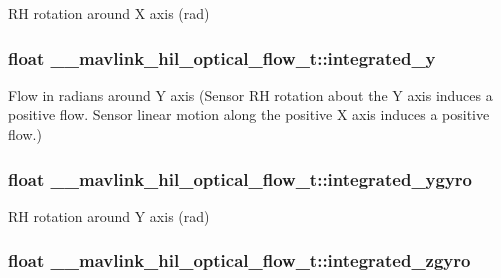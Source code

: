 R\+H rotation around X axis (rad) 

\hypertarget{struct____mavlink__hil__optical__flow__t_a86deaa7c99afacaa74d663e569bb9c47}{
\subsubsection[{integrated\+\_\+y}]{\setlength{\rightskip}{0pt plus 5cm}float \+\_\+\+\_\+mavlink\+\_\+hil\+\_\+optical\+\_\+flow\+\_\+t\+::integrated\+\_\+y}}\label{struct____mavlink__hil__optical__flow__t_a86deaa7c99afacaa74d663e569bb9c47}


Flow in radians around Y axis (Sensor R\+H rotation about the Y axis induces a positive flow. Sensor linear motion along the positive X axis induces a positive flow.) 

\hypertarget{struct____mavlink__hil__optical__flow__t_a31864b9e729286b1e081349f73a8be4e}{
\subsubsection[{integrated\+\_\+ygyro}]{\setlength{\rightskip}{0pt plus 5cm}float \+\_\+\+\_\+mavlink\+\_\+hil\+\_\+optical\+\_\+flow\+\_\+t\+::integrated\+\_\+ygyro}}\label{struct____mavlink__hil__optical__flow__t_a31864b9e729286b1e081349f73a8be4e}


R\+H rotation around Y axis (rad) 

\hypertarget{struct____mavlink__hil__optical__flow__t_a5c3d0e2fbc9e21580c7c29ce220c5cf0}{
\subsubsection[{integrated\+\_\+zgyro}]{\setlength{\rightskip}{0pt plus 5cm}float \+\_\+\+\_\+mavlink\+\_\+hil\+\_\+optical\+\_\+flow\+\_\+t\+::integrated\+\_\+zgyro}}\label{struct____mavlink__hil__optical__flow__t_a5c3d0e2fbc9e21580c7c29ce220c5cf0}


